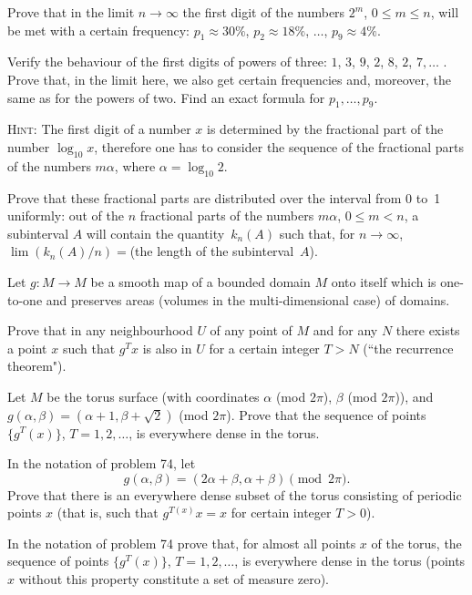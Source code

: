 \documentclass[12pt]{article}  %
\begin{document}
Prove that in the limit $n \to \infty$ the first digit of the numbers $2^m$,
$0\leqslant m \leqslant n$, will be met with a certain frequency:
$p_1 \approx 30\%$, $p_2 \approx 18\%$,  $\dots$, $p_9 \approx 4\%$.

\bigskip
{} Verify the behaviour of the first digits of powers of three: $1$,
$3$, $9$, $2$, $8$, $2$, $7, \dots$ . Prove that, in the limit here, we also 
get certain frequencies and, moreover, the same as for the powers of two.
Find an exact formula for $p_1, \dots, p_9$.

\medskip
\textsc{Hint:} The first digit of a number $x$ is determined by the fractional part
of the number $\log_{10} x$, therefore one has to consider the sequence of the fractional parts of
the numbers $m \alpha$, where $\alpha=\log_{10} 2$.

Prove that these fractional parts are distributed over the interval from 0 to~1
uniformly: out of the $n$ fractional parts of the numbers $m \alpha$, $0 \leqslant m<n$,
a subinterval $A$ will contain the quantity~$k_n (A)$ such that, for $n \to \infty$,
$\lim (k_n (A)/n)={}$(the length of the subinterval~$A$).
\pagebreak[3]

\bigskip
{} Let $g\colon M \to M$ be a smooth map of a bounded domain $M$ onto itself which
is one-to-one and preserves areas (volumes in the multi-dimensional case) of domains.

Prove that in any neighbourhood $U$ of any point of $M$ and for any $N$ there exists a point $x$
such that $g^T x$ is also in $U$ for a certain integer $T>N$ (``the recurrence theorem").

\bigskip
{} Let $M$ be the torus surface (with coordinates $\alpha$ (mod $2\pi$), $\beta$ (mod $2\pi$)), 
and $g(\alpha, \beta)=(\alpha+1, \beta+ \sqrt{2})$ (mod $2\pi$). Prove that the sequence of points
$\{g^T (x)\}$, $T=1, 2, \dots$, is everywhere dense in the torus.

\bigskip
{} In the notation of problem 74, let
$$
g(\alpha, \beta)=(2\alpha+\beta,\alpha+\beta) \pmod {2\pi}.
$$ 
Prove that there is an everywhere dense subset of the torus consisting of periodic points $x$ (that is, such that 
$g^{T (x)} x=x$ for certain integer $T>0$).

\bigskip
{} In the notation of problem 74 prove that, for almost all points $x$ of the torus,
the sequence of points $\{g^T (x)\}$, $T=1, 2, \dots$, is everywhere dense in the torus
(points $x$ without this property constitute a set of measure zero).
\end{document}
